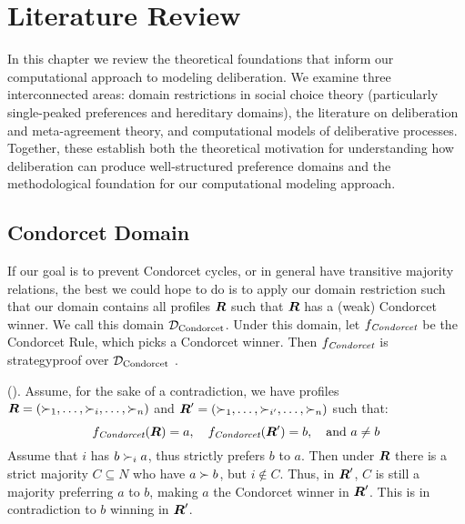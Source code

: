\newpage
\chapter{Literature Review}
\label{Literature}




In this chapter we review the theoretical foundations that inform our
computational approach to modeling deliberation. We examine three
interconnected areas: domain restrictions in social choice theory (particularly
single-peaked preferences and hereditary domains), the literature on
deliberation and meta-agreement theory, and computational models of
deliberative processes. Together, these establish both the theoretical
motivation for understanding how deliberation can produce well-structured
preference domains and the methodological foundation for our computational
modeling approach.


\section{Condorcet Domain}
If our goal is to prevent Condorcet cycles, or in general have transitive
majority relations, the best we could hope to do is to apply our domain
restriction such that our domain contains all profiles $\boldsymbol{R}$ such that $\boldsymbol{R}$ has a
(weak) Condorcet winner. We call this domain $\mathcal{D}_{\textnormal{Condorcet}}$. Under this
domain, let $f_{\textit{Condorcet}}$ be the Condorcet Rule, which picks a
Condorcet winner. Then $f_{\textit{Condorcet}}$ is strategyproof over
$\mathcal{D}_{\textnormal{Condorcet}}$ \citep{elkindPreferenceRestrictionsComputational2022}.

\begin{proofc}{(\citet{elkindPreferenceRestrictionsComputational2022})}.
	Assume, for the sake of a contradiction, we have profiles $\boldsymbol{R} = (\succ_1, \dots, \succ_i, \dots, \succ_n)$ and $\boldsymbol{R}' = (\succ_1, \dots, \succ_{i'}, \dots, \succ_n)$ such that:
	\[
		f_{\textit{Condorcet}}(\boldsymbol{R}) = a, \quad f_{\textit{Condorcet}}(\boldsymbol{R}') = b, \quad \text{and } a \neq b
	\]
	Assume that $i$ has $b \succ_i a$, thus strictly prefers $b$ to $a$.
	Then under $\boldsymbol{R}$ there is a strict majority $C \subseteq N$
	who have $a \succ b$, but $i \notin C$. Thus, in $\boldsymbol{R}'$, $C$
	is still a majority preferring $a$ to $b$, making $a$ the Condorcet
	winner in $\boldsymbol{R}'$. This is in contradiction to $b$ winning
	in $\boldsymbol{R}'$.
\end{proofc}

